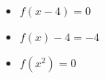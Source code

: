 \documentclass[11pt]{book}
\theoremstyle{definition}  %
\newcounter{HW}
\begin{document}
\begin{multicols}{3}
\begin{itemize}
\item  $f(x-4)=0$
\item $f(x) - 4=-4$
\item  $f\left(x^2\right)=0$
\end{itemize}
\end{multicols}
\normalsize












\end{document}
